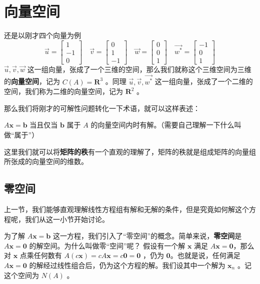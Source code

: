 \section{向量空间}

还是以刚才四个向量为例
$$
\vec u=\begin{bmatrix}1\\-1\\0\end{bmatrix}\quad
\vec v=\begin{bmatrix}0\\1\\-1\end{bmatrix}\quad
\vec w=\begin{bmatrix}0\\0\\1\end{bmatrix}\quad 
\vec{w^*}=\begin{bmatrix}-1\\0\\1\end{bmatrix}
$$
$\vec u,\vec v,\vec w$ 这一组向量，张成了一个三维的空间，那么我们就称这个三维空间为三维的\textbf{向量空间}，记为 $C(A)=\mathbf R^3$ 。同理 $\vec u,\vec v,\vec{w^*}$ 这一组向量，张成了一个二维的空间，我们称为二维的向量空间，记为 $\mathbf R^2$ 。

那么我们将刚才的可解性问题转化一下术语，就可以这样表述：

$A\mathbf x=\mathbf b$ 当且仅当 $\mathbf b$ 属于 $A$  的向量空间内时有解。（需要自己理解一下什么叫做“属于”）

这里我们就可以将\textbf{矩阵的秩}有一个直观的理解了，矩阵的秩就是组成矩阵的向量组所张成的向量空间的维数。

\subsection{零空间}

上一节，我们能够直观理解线性方程组有解和无解的条件，但是究竟如何解这个方程呢，我们从这一小节开始讨论。

为了解 $A\mathbf x=\mathbf b$ 这一方程，我们引入了“零空间”的概念。简单来说，\textbf{零空间}是 $A\mathbf x=\mathbf 0$ 的解空间。为什么叫做零“空间”呢？
假设有一个解 $\mathbf {x}$ 满足 $A\mathbf x=\mathbf 0$，那么对 $\mathbf x$ 点乘任何数有 $A(c\mathbf x)=cA\mathbf x=c\mathbf 0=\mathbf 0$ ，仍为 $\mathbf 0$。也就是说，任何满足 $A\mathbf x=\mathbf 0$ 的解经过线性组合后，仍为这个方程的解。我们设其中一个解为 $\mathbf x_n$ 。记这个空间为 $N(A)$ 。

